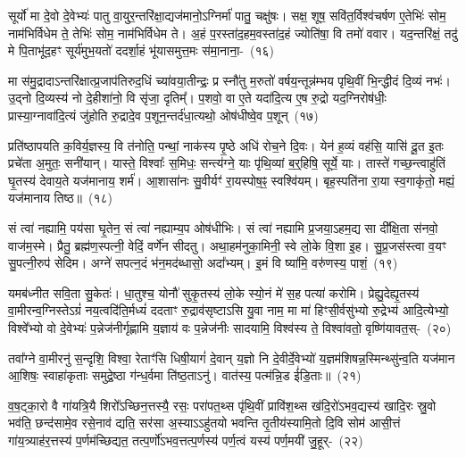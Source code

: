सूर्यो॑ मा दे॒वो दे॒वेभ्यः॑ पातु वा॒युर॒न्तरि॑क्षा॒द्यज॑मानो॒\-ऽग्निर्मा॑ पातु॒ चक्षु॑षः। सक्ष॒ शूष॒ सवि॑त॒र्विश्व॑चर्\mbox{}षण ए॒तेभिः॑ सोम॒ नाम॑भिर्विधेम ते॒ तेभिः॑ सोम॒ नाम॑भिर्विधेम ते। अ॒हं प॒रस्ता॑द॒हम॒वस्ता॑द॒हं ज्योति॑षा॒ वि तमो॑ ववार। यद॒न्तरि॑क्षं॒ तदु॑ मे पि॒ताभू॑द॒हꣳ सूर्य॑मुभ॒यतो॑ ददर्\mbox{}शा॒हं भू॑यासमुत्त॒मः स॑मा॒नाना॒-~(१६)\ip

मा स॑मु॒द्रादा\-ऽन्तरि॑क्षात्प्र॒जा\-प॑तिरुद॒धिं च्या॑वया॒तीन्द्रः॒ प्र स्नौ॑तु म॒रुतो॑ वर्\mbox{}षय॒न्तून्न॑म्भय पृथि॒वीं भि॒न्द्धीदं दि॒व्यं नभः॑। उ॒द्नो दि॒व्यस्य॑ नो दे॒हीशा॑नो॒ वि सृ॑जा॒ दृतिम्᳚। प॒शवो॒ वा ए॒ते यदा॑दि॒त्य ए॒ष रु॒द्रो यद॒ग्निरोष॑धीः॒ प्रास्या॒ग्नावा॑दि॒त्यं जु॑होति रु॒द्रादे॒व प॒शून॒न्तर्द॑धा॒त्यथो॒ ओष॑धीष्वे॒व प॒शून्~(१७)\ip

प्रति॑\-ष्ठापयति क॒विर्य॒ज्ञस्य॒ वि त॑नोति॒ पन्थां॒ नाक॑स्य पृ॒ष्ठे अधि॑ रोच॒ने दि॒वः। येन॑ ह॒व्यं वह॑सि॒ यासि॑ दू॒त इ॒तः प्रचे॑ता अ॒मुतः॒ सनी॑यान्। यास्ते॒ विश्वाः᳚ स॒मिधः॒ सन्त्य॑ग्ने॒ याः पृ॑थि॒व्यां ब॒र्॒\mbox{}हिषि॒ सूर्ये॒ याः। तास्ते॑ गच्छ॒न्त्वाहु॑तिं घृ॒तस्य॑ देवाय॒ते यज॑मानाय॒ शर्म॑। आ॒शासा॑नः सु॒वीर्यꣳ॑ रा॒यस्पोष॒ꣴ॒ स्वश्वि॑यम्। बृह॒स्पति॑ना रा॒या स्व॒गाकृ॑तो॒ मह्यं॒ यज॑मानाय तिष्ठ॥~(१८)\ip

{\anuvakamend[{स॒मा॒नाना॒मोष॑धीष्वे॒व प॒शून्मह्यं॒ यज॑माना॒यैक॑ञ्च}]}

सं त्वा॑ नह्यामि॒ पय॑सा घृ॒तेन॒ सं त्वा॑ नह्याम्य॒प ओष॑धीभिः। सं त्वा॑ नह्यामि प्र॒जया॒\-ऽहम॒द्य सा दी᳚क्षि॒ता स॑नवो॒ वाज॑म॒स्मे। प्रैतु॒ ब्रह्म॑ण॒स्पत्नी॒ वेदिं॒ वर्णे॑न सीदतु। अथा॒हम॑नुका॒मिनी॒ स्वे लो॒के वि॒शा इ॒ह। सु॒प्र॒जस॑स्त्वा व॒यꣳ सु॒पत्नी॒रुप॑ सेदिम। अग्ने॑ सपत्न॒दं भ॑न॒मद॑ब्धासो॒ अदा᳚भ्यम्। इ॒मं वि ष्या॑मि॒ वरु॑णस्य॒ पाशं॒~(१९)\ip

यमब॑ध्नीत सवि॒ता सु॒केतः॑। धा॒तुश्च॒ योनौ॑ सुकृ॒तस्य॑ लो॒के स्यो॒नं मे॑ स॒ह पत्या॑ करोमि। प्रेह्यु॒देह्यृ॒तस्य॑ वा॒मीरन्व॒ग्निस्ते\-ऽग्रं॑ नय॒त्वदि॑ति॒र्मध्यं॑ ददताꣳ रु॒द्राव॑सृष्टाऽसि यु॒वा नाम॒ मा मा॑ हिꣳसी॒र्वसु॑भ्यो रु॒द्रेभ्य॑ आदि॒त्येभ्यो॒ विश्वे᳚भ्यो वो दे॒वेभ्यः॑ प॒न्ने\-ज॑नीर्गृह्णामि य॒ज्ञाय॑ वः प॒न्ने\-ज॑नीः सादयामि॒ विश्व॑स्य ते॒ विश्वा॑वतो॒ वृष्णि॑यावत॒स्-~(२०)\ip

तवा᳚ग्ने वा॒मीरनु॑ स॒न्दृशि॒ विश्वा॒ रेताꣳ॑सि धिषी॒यागं॑ दे॒वान् य॒ज्ञो नि दे॒वीर्दे॒वेभ्यो॑ य॒ज्ञम॑शिषन्न॒स्मिन्थ्सु॑न्व॒ति यज॑मान आ॒शिषः॒ स्वाहा॑कृताः समुद्रे॒ष्ठा ग॑न्ध॒र्वमा ति॑ष्ठ॒ता\-ऽनु॑। वात॑स्य॒ पत्म॑न्नि॒ड ई॑डि॒ताः॥~(२१)\ip

{\anuvakamend[{पाशं॒ वृष्णि॑यावतस्त्रि॒ꣳ॒शच्च॑}]}

व॒ष॒ट्का॒रो वै गा॑यत्रि॒यै शिरो᳚\-ऽच्छिन॒त्तस्यै॒ रसः॒ परा॑पत॒थ्स पृ॑थि॒वीं प्रावि॑श॒थ्स ख॑दि॒रो॑\-ऽभव॒द्यस्य॑ खादि॒रः स्रु॒वो भव॑ति॒ छन्द॑सामे॒व रसे॒नाव॑ द्यति॒ सर॑सा अ॒स्या\-ऽऽ\-हु॑तयो भवन्ति तृ॒तीय॑स्यामि॒तो दि॒वि सोम॑ आसी॒त्तं गा॑य॒त्र्याह॑र॒त्तस्य॑ प॒र्णम॑च्छिद्यत॒ तत्प॒र्णो॑\-ऽभव॒त्तत्प॒र्णस्य॑ पर्ण॒त्वं यस्य॑ पर्ण॒मयी॑ जु॒हूर्-~(२२)\ip

